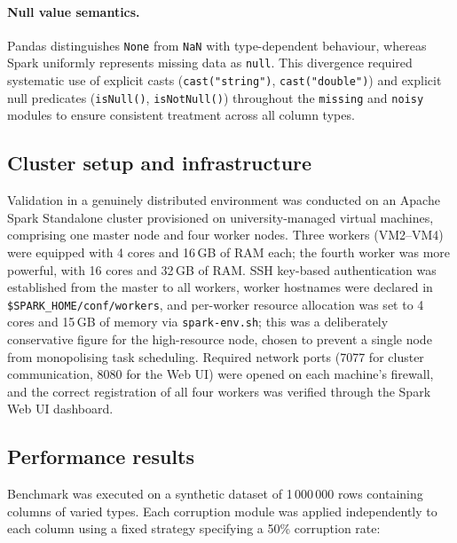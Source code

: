 \documentclass{article}
\begin{document}
\paragraph{Null value semantics.}
Pandas distinguishes \texttt{None} from \texttt{NaN} with type-dependent behaviour, whereas Spark uniformly represents missing data as \texttt{null}. This divergence required systematic use of explicit casts (\texttt{cast("string")}, \texttt{cast("double")}) and explicit null predicates (\texttt{isNull()}, \texttt{isNotNull()}) throughout the \texttt{missing} and \texttt{noisy} modules to ensure consistent treatment across all column types.

\subsection{Cluster setup and infrastructure}

Validation in a genuinely distributed environment was conducted on an Apache Spark Standalone cluster provisioned on university-managed virtual machines, comprising one master node and four worker nodes. Three workers (VM2--VM4) were equipped with 4 cores and 16\,GB of RAM each; the fourth worker was more powerful, with 16 cores and 32\,GB of RAM. SSH key-based authentication was established from the master to all workers, worker hostnames were declared in \texttt{\$SPARK\_HOME/conf/workers}, and per-worker resource allocation was set to 4 cores and 15\,GB of memory via \texttt{spark-env.sh}; this was a deliberately conservative figure for the high-resource node, chosen to prevent a single node from monopolising task scheduling. Required network ports (7077 for cluster communication, 8080 for the Web UI) were opened on each machine's firewall, and the correct registration of all four workers was verified through the Spark Web UI dashboard.

\subsection{Performance results}

Benchmark was executed on a synthetic dataset of 1\,000\,000 rows containing columns of varied types. Each corruption module was applied independently to each column using a fixed strategy specifying a 50\% corruption rate:
\end{document}
